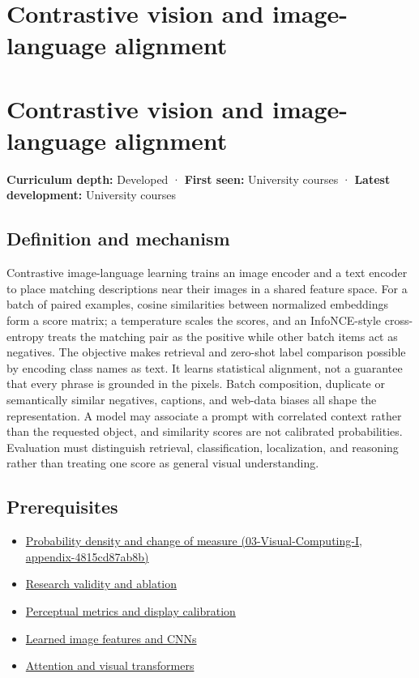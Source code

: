 \hypertarget{appendix-772f1fd96148}{}
\section*{Contrastive vision and image-language alignment}
\section{Contrastive vision and image-language alignment}\label{appendix-772f1fd96148-contrastive-vision-and-image-language-alignment}

\textbf{Curriculum depth:} Developed · \textbf{First seen:} University courses · \textbf{Latest development:} University courses

\subsection{Definition and mechanism}\label{appendix-772f1fd96148-definition-and-mechanism}

Contrastive image-language learning trains an image encoder and a text encoder to place matching descriptions near their images in a shared feature space. For a batch of paired examples, cosine similarities between normalized embeddings form a score matrix; a temperature scales the scores, and an InfoNCE-style cross-entropy treats the matching pair as the positive while other batch items act as negatives. The objective makes retrieval and zero-shot label comparison possible by encoding class names as text. It learns statistical alignment, not a guarantee that every phrase is grounded in the pixels. Batch composition, duplicate or semantically similar negatives, captions, and web-data biases all shape the representation. A model may associate a prompt with correlated context rather than the requested object, and similarity scores are not calibrated probabilities. Evaluation must distinguish retrieval, classification, localization, and reasoning rather than treating one score as general visual understanding.

\subsection{Prerequisites}\label{appendix-772f1fd96148-prerequisites}

\begin{itemize}
\tightlist
\item
  \href{../03-Visual-Computing-I/main.pdf\#nameddest=appendix-4815cd87ab8b}{Probability density and change of measure (03-Visual-Computing-I, appendix-4815cd87ab8b)}
\item
  \hyperref[appendix-65788587ef78]{Research validity and ablation}
\item
  \hyperref[appendix-b2c1846508bf]{Perceptual metrics and display calibration}
\item
  \hyperref[appendix-47c51ea026fb]{Learned image features and CNNs}
\item
  \hyperref[appendix-a9d5dfdd164a]{Attention and visual transformers}
\end{itemize}

